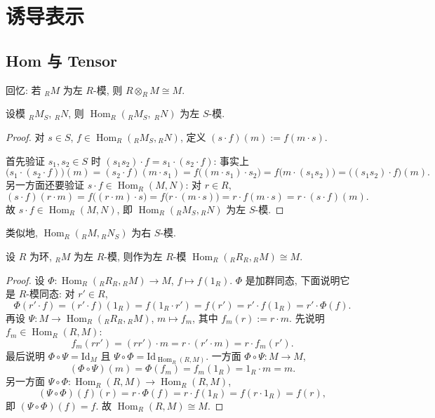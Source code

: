 \section{诱导表示}

\subsection{Hom 与 Tensor}

回忆: 若 ${}_R M$ 为左 $R$-模, 则 $R\otimes_R M\cong M$.

\begin{proposition}\label{prop:hom-left-S-module}
设模 ${}_R M_S$, ${}_R N$, 则 $\operatorname{Hom}_R({}_R M_S,\ {}_R N)$ 为左 $S$-模.
\end{proposition}

\begin{proof}
对 $s\in S$, $f\in\operatorname{Hom}_R({}_R M_S,{}_R N)$, 定义 $(s\cdot f)(m):=f(m\cdot s)$.

首先验证 $s_1,s_2\in S$ 时 $(s_1s_2)\cdot f=s_1\cdot(s_2\cdot f)$: 事实上
\[
  \bigl(s_1\cdot(s_2\cdot f)\bigr)(m)=(s_2\cdot f)(m\cdot s_1)
  =f\bigl((m\cdot s_1)\cdot s_2\bigr)=f\bigl(m\cdot(s_1s_2)\bigr)=\bigl((s_1s_2)\cdot f\bigr)(m).
\]
另一方面还要验证 $s\cdot f\in\operatorname{Hom}_R(M,N)$: 对 $r\in R$,
\[
  (s\cdot f)(r\cdot m)=f\bigl((r\cdot m)\cdot s\bigr)=f\bigl(r\cdot(m\cdot s)\bigr)
  =r\cdot f(m\cdot s)=r\cdot(s\cdot f)(m).
\]
故 $s\cdot f\in\operatorname{Hom}_R(M,N)$, 即 $\operatorname{Hom}_R({}_R M_S,{}_R N)$ 为左 $S$-模.
\end{proof}

\begin{remark}\label{rem:hom-right-module}
类似地, $\operatorname{Hom}_R({}_R M,{}_R N_S)$ 为右 $S$-模.
\end{remark}

\begin{lemma}\label{lem:hom-R-M}
设 $R$ 为环, ${}_R M$ 为左 $R$-模, 则作为左 $R$-模
$\operatorname{Hom}_R({}_R R_R,{}_R M)\cong M$.
\end{lemma}

\begin{proof}
设 $\Phi\colon\operatorname{Hom}_R({}_R R_R,{}_R M)\to M$, $f\mapsto f(1_R)$.
$\Phi$ 是加群同态, 下面说明它是 $R$-模同态: 对 $r'\in R$,
\[
  \Phi(r'\cdot f)=(r'\cdot f)(1_R)=f(1_R\cdot r')=f(r')=r'\cdot f(1_R)=r'\cdot\Phi(f).
\]
再设 $\Psi\colon M\to\operatorname{Hom}_R({}_R R_R,{}_R M)$, $m\mapsto f_m$, 其中 $f_m(r):=r\cdot m$.
先说明 $f_m\in\operatorname{Hom}_R(R,M)$:
\[
  f_m(rr')=(rr')\cdot m=r\cdot(r'\cdot m)=r\cdot f_m(r').
\]
最后说明 $\Phi\circ\Psi=\mathrm{Id}_M$ 且 $\Psi\circ\Phi=\mathrm{Id}_{\operatorname{Hom}_R(R,M)}$.
一方面 $\Phi\circ\Psi\colon M\to M$,
\[
  (\Phi\circ\Psi)(m)=\Phi(f_m)=f_m(1_R)=1_R\cdot m=m .
\]
另一方面 $\Psi\circ\Phi\colon\operatorname{Hom}_R(R,M)\to\operatorname{Hom}_R(R,M)$,
\[
  (\Psi\circ\Phi)(f)(r)=r\cdot\Phi(f)=r\cdot f(1_R)=f(r\cdot 1_R)=f(r),
\]
即 $(\Psi\circ\Phi)(f)=f$. 故 $\operatorname{Hom}_R(R,M)\cong M$.
\end{proof}


